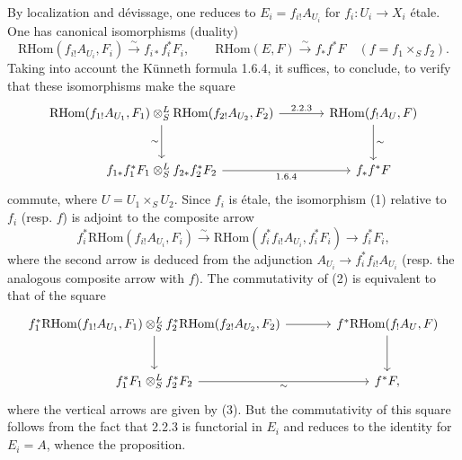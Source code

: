 \documentclass[11pt]{article}
\providecommand{\RHom}{\mathrm{RHom}}
\providecommand{\RHom}{\mathrm{RHom}}
\providecommand{\RHom}{\mathrm R\mathcal{H}om}
\begin{document}
By localization and dévissage, one reduces to $E_i=f_{i!}A_{U_i}$ for $f_i:U_i\to X_i$ étale. One has canonical isomorphisms (duality)
\begin{equation}\tag{1}
\RHom(f_{i!}A_{U_i},F_i)\xrightarrow{\sim}f_{i*}f_i^{*}F_i,
\qquad
\RHom(E,F)\xrightarrow{\sim}f_{*}f^{*}F\quad(f=f_1\times_S f_2).
\end{equation}
Taking into account the Künneth formula 1.6.4, it suffices, to conclude, to verify that these isomorphisms make the square
\[
\begin{tikzcd}[column sep=large,row sep=large]
\RHom(f_{1!}A_{U_1},F_1)\otimes^{L}_{S}\RHom(f_{2!}A_{U_2},F_2) \arrow[r,"2.2.3"] \arrow[d,"\sim"'] & \RHom(f_{!}A_U,F) \arrow[d,"\sim"]\\
f_{1*}f_1^{*}F_1\otimes^{L}_{S}f_{2*}f_2^{*}F_2 \arrow[r,"1.6.4"'] & f_{*}f^{*}F
\end{tikzcd}
\]
commute, where $U=U_1\times_SU_2$. Since $f_i$ is étale, the isomorphism (1) relative to $f_i$ (resp. $f$) is adjoint to the composite arrow
\begin{equation}\tag{3}
f_i^{*}\RHom(f_{i!}A_{U_i},F_i)\xrightarrow{\sim}\RHom(f_i^{*}f_{i!}A_{U_i},f_i^{*}F_i)\longrightarrow f_i^{*}F_i,
\end{equation}
where the second arrow is deduced from the adjunction $A_{U_i}\to f_i^{*}f_{i!}A_{U_i}$ (resp. the analogous composite arrow with $f$). The commutativity of (2) is equivalent to that of the square
\[
\begin{tikzcd}[column sep=large,row sep=large]
f_1^{*}\RHom(f_{1!}A_{U_1},F_1)\otimes^{L}_{S}f_2^{*}\RHom(f_{2!}A_{U_2},F_2) \arrow[r] \arrow[d] & f^{*}\RHom(f_{!}A_U,F) \arrow[d]\\
f_1^{*}F_1\otimes^{L}_{S}f_2^{*}F_2 \arrow[r,"\sim"'] & f^{*}F,
\end{tikzcd}
\]
where the vertical arrows are given by (3). But the commutativity of this square follows from the fact that 2.2.3 is functorial in $E_i$ and reduces to the identity for $E_i=A$, whence the proposition.
\end{document}
